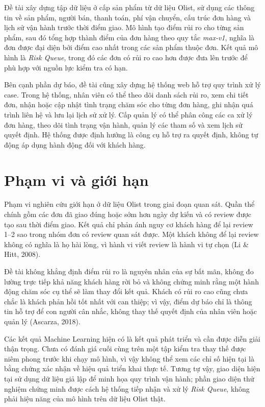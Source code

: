 Đề tài xây dựng tập dữ liệu ở cấp sản phẩm từ dữ liệu Olist, sử dụng các thông tin về sản phẩm, người bán, thanh toán, phí vận chuyển, cấu trúc đơn hàng và lịch sử vận hành trước thời điểm giao. Mô hình tạo điểm rủi ro cho từng sản phẩm, sau đó tổng hợp thành điểm của đơn hàng theo quy tắc \emph{max-v1}, nghĩa là đơn được đại diện bởi điểm cao nhất trong các sản phẩm thuộc đơn. Kết quả mô hình là \emph{Risk Queue}, trong đó các đơn có rủi ro cao hơn được đưa lên trước để phù hợp với nguồn lực kiểm tra có hạn.

Bên cạnh phần dự báo, đề tài cũng xây dựng hệ thống web hỗ trợ quy trình xử lý case. Trong hệ thống, nhân viên có thể theo dõi danh sách rủi ro, xem chi tiết đơn, nhận hoặc cập nhật tình trạng chăm sóc cho từng đơn hàng, ghi nhận quá trình liên hệ và lưu lại lịch sử xử lý. Cấp quản lý có thể phân công các ca xử lý đơn hàng, theo dõi tình trạng vận hành, quản lý các tham số và xem lịch sử quyết định. Hệ thống được định hướng là công cụ hỗ trợ ra quyết định, không tự động áp dụng hành động đối với khách hàng.

\section{Phạm vi và giới hạn}
\label{sec:pham-vi}

Phạm vi nghiên cứu giới hạn ở dữ liệu Olist trong giai đoạn quan sát. Quần thể chính gồm các đơn đã giao đúng hoặc sớm hơn ngày dự kiến và có review được tạo sau thời điểm giao. Kết quả chỉ phản ánh nguy cơ khách hàng để lại review 1--2 sao trong nhóm đơn có review quan sát được. Một khách không để lại review không có nghĩa là họ hài lòng, vì hành vi viết review là hành vi tự chọn (Li \& Hitt, 2008).

Đề tài không khẳng định điểm rủi ro là nguyên nhân của sự bất mãn, không đo lường trực tiếp khả năng khách hàng rời bỏ và không chứng minh rằng một hành động chăm sóc cụ thể sẽ làm thay đổi kết quả. Khách có rủi ro cao cũng chưa chắc là khách phản hồi tốt nhất với can thiệp; vì vậy, điểm dự báo chỉ là thông tin hỗ trợ để con người cân nhắc, không thay thế quyết định của nhân viên hoặc quản lý (Ascarza, 2018).

Các kết quả Machine Learning hiện có là kết quả phát triển và cần được diễn giải thận trọng. Chưa có đánh giá cuối cùng trên một tập kiểm tra thay thế được niêm phong trước khi chạy mô hình, vì vậy không thể xem các chỉ số hiện tại là bằng chứng xác nhận về hiệu quả triển khai thực tế. Tương tự vậy, giao diện hiện tại sử dụng dữ liệu giả lập để minh họa quy trình vận hành; phần giao diện thử nghiệm chứng minh được cách hệ thống tiếp nhận và xử lý \emph{Risk Queue}, không phải hiệu năng của mô hình trên dữ liệu Olist thật.

